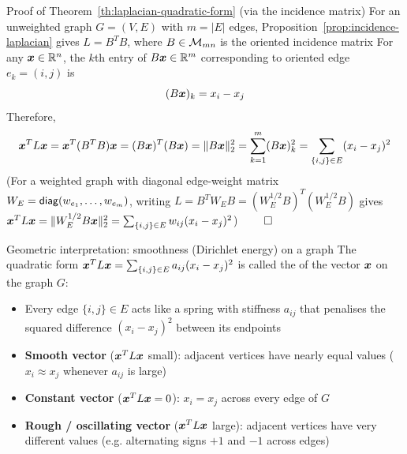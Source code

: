 \documentclass[aspectratio=169]{beamer}\usepackage[]{graphicx}\usepackage[]{xcolor}
\begin{document}
\begin{frame}{Proof of Theorem~\ref{th:laplacian-quadratic-form} (via the incidence matrix)}
For an unweighted graph $G = (V, E)$ with $m = |E|$ edges, Proposition~\ref{prop:incidence-laplacian} gives $L = B^T B$, where $B \in \mathcal{M}_{mn}$ is the oriented incidence matrix
\vfill
For any $\bm{x} \in \mathbb{R}^n$, the $k$th entry of $B\bm{x} \in \mathbb{R}^m$ corresponding to oriented edge $e_k = (i, j)$ is
\[
(B\bm{x})_k = x_i - x_j
\]
\vfill
Therefore,
\[
\bm{x}^T L \bm{x} = \bm{x}^T (B^T B) \bm{x} = (B\bm{x})^T (B\bm{x}) = \|B\bm{x}\|_2^2 = \sum_{k=1}^m (B\bm{x})_k^2 = \sum_{\{i, j\} \in E} (x_i - x_j)^2
\]
\vfill
(For a weighted graph with diagonal edge-weight matrix $W_E = \mathsf{diag}(w_{e_1}, \ldots, w_{e_m})$, writing $L = B^T W_E B = (W_E^{1/2} B)^T (W_E^{1/2} B)$ gives $\bm{x}^T L \bm{x} = \|W_E^{1/2} B\bm{x}\|_2^2 = \sum_{\{i,j\}\in E} w_{ij}(x_i - x_j)^2$) \hfill $\qed$
\end{frame}


\begin{frame}{Geometric interpretation: smoothness (Dirichlet energy) on a graph}
The quadratic form $\bm{x}^T L \bm{x} = \sum_{\{i,j\}\in E} a_{ij}(x_i - x_j)^2$ is called the  of the vector $\bm{x}$ on the graph $G$:
\vfill
\begin{itemize}
\item Every edge $\{i, j\} \in E$ acts like a spring with stiffness $a_{ij}$ that penalises the squared difference $(x_i - x_j)^2$ between its endpoints
\vfill
\item \textbf{Smooth vector} ($\bm{x}^T L \bm{x}$ small): adjacent vertices have nearly equal values ($x_i \approx x_j$ whenever $a_{ij}$ is large)
\vfill
\item \textbf{Constant vector} ($\bm{x}^T L \bm{x} = 0$): $x_i = x_j$ across every edge of $G$
\vfill
\item \textbf{Rough / oscillating vector} ($\bm{x}^T L \bm{x}$ large): adjacent vertices have very different values (e.g. alternating signs $+1$ and $-1$ across edges)
\end{itemize}
\end{frame}
\end{document}
